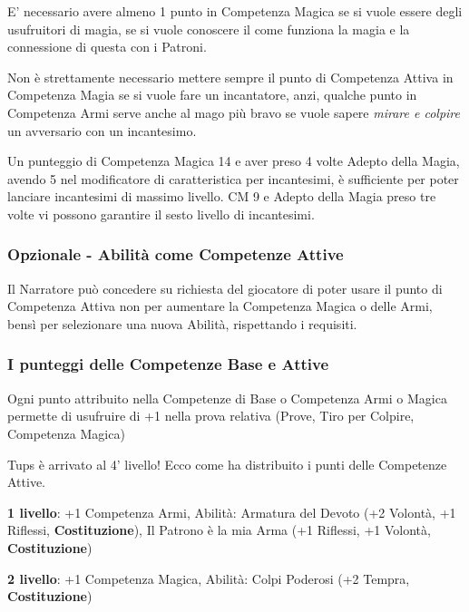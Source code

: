 \begin{multicols}{2}
E' necessario avere almeno 1 punto in Competenza Magica se si vuole essere degli usufruitori di magia, se si vuole conoscere il come funziona la magia e la connessione di questa con i Patroni.

Non è strettamente necessario mettere sempre il punto di Competenza Attiva in Competenza Magia se si vuole fare un incantatore, anzi, qualche punto in Competenza Armi serve anche al mago più bravo se vuole sapere \emph{mirare e colpire} un avversario con un incantesimo.

Un punteggio di Competenza Magica 14 e aver preso 4 volte Adepto della Magia, avendo 5 nel modificatore di caratteristica per incantesimi, è sufficiente per poter lanciare incantesimi di massimo livello. CM 9 e Adepto della Magia preso tre volte vi possono garantire il sesto livello di incantesimi.


\subsubsection{Opzionale - Abilità come Competenze Attive}

Il Narratore può concedere su richiesta del giocatore di poter usare il punto di Competenza Attiva non per aumentare la Competenza Magica o delle Armi, bensì per selezionare una nuova Abilità, rispettando i requisiti.

\subsubsection{I punteggi delle Competenze Base e Attive}\label{punteggicompetenzebaseattive}

Ogni punto attribuito nella Competenze di Base o Competenza Armi o Magica permette di usufruire di +1 nella prova relativa (Prove, Tiro per Colpire, Competenza Magica)

\begin{changemargin}{0.3cm}{0.3cm}\begin{tcolorbox}[title = Tups arriva al 4' livello!]
		
		Tups è arrivato al 4' livello! Ecco come ha distribuito i punti delle Competenze Attive.
		
		\textbf{1 livello}: +1 Competenza Armi, Abilità: Armatura del Devoto (+2 Volontà, +1 Riflessi, \textbf{Costituzione}), Il Patrono è la mia Arma (+1 Riflessi, +1 Volontà, \textbf{Costituzione})
		
		\textbf{2 livello}: +1 Competenza Magica, Abilità: Colpi Poderosi (+2 Tempra, \textbf{Costituzione})
		

\end{tcolorbox}
\end{changemargin}
\end{multicols}
